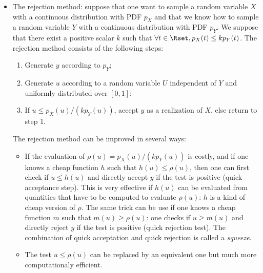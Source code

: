 {\begin{itemize}
  \item The rejection method: suppose that one want to sample a random variable $X$ with a continuous distribution with PDF $p_X$ and that we know how to sample a random variable $Y$ with a continuous distribution with PDF $p_Y$. We suppose that there exist a positive scalar $k$ such that $\forall t\in\Rset, p_X(t)\leq kp_Y(t)$. The rejection method consists of the following steps:
    \begin{enumerate}
    \item Generate $y$ according to $p_Y$;
    \item Generate $u$ according to a random variable $U$ independent of $Y$ and uniformly distributed over $[0, 1]$;
    \item If $u\leq p_X(u)/(kp_Y(u))$, accept $y$ as a realization of $X$, else return to step 1.
    \end{enumerate}
    The rejection method can be improved in several ways:
    \begin{itemize}
    \item If the evaluation of $\rho(u)=p_X(u)/(kp_Y(u))$ is costly, and if one knows a cheap function $h$ such that $h(u) \leq \rho(u)$, then one can first check if $u\leq h(u)$ and directly accept $y$ if the test is positive (quick acceptance step). This is very effective if $h(u)$ can be evaluated from quantities that have to be computed to evaluate $\rho(u)$: $h$ is a kind of cheap version of $\rho$. The same trick can be use if one knows a cheap function $m$ such that $m(u) \geq \rho(u)$: one checks if $u\geq m(u)$ and directly reject $y$ if the test is positive (quick rejection test). The combination of quick acceptation and quick rejection is called a \emph{squeeze}.
    \item The test $u\leq \rho(u)$ can be replaced by an equivalent one but much more computationaly efficient.
    \end{itemize}


\end{itemize}}
